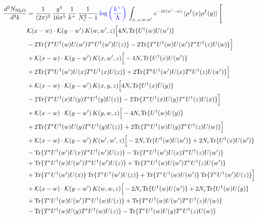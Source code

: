 \documentclass[9pt]{article}
\numberwithin{equation}{section}
\begin{document}
\begin{align}
    \frac{d^{3}N_{\mathrm{NLO}}}{d^{3}k} & = \frac{1}{(2\pi)^{3}}\,\frac{g^{4}}{16\pi^{5}}\,\frac{1}{k^{+}}\,\frac{1}{N^{2}_{c}-1}\,{\color{blue}\log{\left(\frac{k^{+}}{\Lambda}\right)}}\,\int_{x,,z,w,w'}e^{-ik(w'-w)}\,\langle\rho^{f}(x)\rho^{f}(y) \rangle\,\Bigg[\notag \\ & \mathcal K(x-w)\cdot\mathcal K(y-w')\,K(w,w',z)\Big[4 N_{c}{\rm Tr}\{U^\dagger(w)U(w')\}\notag\\
&-2{\rm Tr}\{T^eU^\dagger(w)U(w')T^eU^\dagger(w')U(z)\}-2{\rm Tr}\{T^eU^\dagger(w)U(w')T^eU^\dagger(z)U(w)\}\Big]\notag\\
&+\mathcal K(x-w)\cdot\mathcal K(y-w')\,K(x,w',z)\Big[-4 N_{c}{\rm Tr}\{U^\dagger(x)U(w')\}\notag\\
&+2{\rm Tr}\{T^eU^\dagger(w')U(x)T^eU^\dagger(x)U(z)\}+2{\rm Tr}\{T^eU^\dagger(w')U(x)T^eU^\dagger(z)U(w')\}\Big]\notag\\
&+\mathcal K(x-w)\cdot\mathcal K(y-w')\,K(x,y,z)\Big[4 N_{c}{\rm Tr}\{U^\dagger(x)U(y)\}\notag\\
&-2{\rm Tr}\{T^eU^\dagger(x)U(y)T^eU^\dagger(y)U(z)\}-2{\rm Tr}\{T^eU^\dagger(x)U(y)T^eU^\dagger(z)U(x)\}\Big]\notag\\
&+\mathcal K(x-w)\cdot\mathcal K(y-w')\,K(y,w,z)\Big[-4 N_{c}{\rm Tr}\{U^\dagger(w)U(y)\}\notag\\
&+2{\rm Tr}\{T^eU^\dagger(w)U(y)T^eU^\dagger(y)U(z)\}+2{\rm Tr}\{T^eU^\dagger(w)U(y)T^eU^\dagger(z)U(w)\}\Big]\notag\\
&+\mathcal K(x-w)\cdot\mathcal K(y-w')\,K(w',w',z)\Big[-2 N_{c}{\rm Tr}\{U^\dagger(w)U(w')\}+2 N_{c}{\rm Tr}\{U^\dagger(x)U(w')\}\notag\\
&-{\rm Tr}\{T^eU^\dagger(w')U(x)T^eU^\dagger(w')U(z)\}-{\rm Tr}\{T^eU^\dagger(w')U(x)T^eU^\dagger(z)U(w')\}\notag\\
&+{\rm Tr}\{T^eU^\dagger(w)U(w')T^eU^\dagger(w')U(z)\}+{\rm Tr}\{T^eU^\dagger(w)U(w')T^eU^\dagger(z)U(w')\}\notag\\
&+{\rm Tr}\{T^eU^\dagger(w')U(x)\}\,{\rm Tr}\{T^eU^\dagger(w')U(z)\}+{\rm Tr}\{T^eU^\dagger(w)U(w')\}\,{\rm Tr}\{T^eU^\dagger(w')U(z)\}\Big]\notag\\
&+\mathcal K(x-w)\cdot\mathcal K(y-w')\,K(w,w,z)\Big[-2 N_{c}{\rm Tr}\{U^\dagger(w)U(w')\}+2 N_{c}{\rm Tr}\{U^\dagger(w)U(y)\}\notag\\
&+{\rm Tr}\{T^eU^\dagger(w)U(w')T^eU^\dagger(w)U(z)\}+{\rm Tr}\{T^eU^\dagger(w)U(w')T^eU^\dagger(z)U(w)\}\notag\\
&-{\rm Tr}\{T^eU^\dagger(w)U(y)T^eU^\dagger(w)U(z)\}-{\rm Tr}\{T^eU^\dagger(w)U(y)T^eU^\dagger(z)U(w)\}\notag\\

\end{align}
\end{document}
